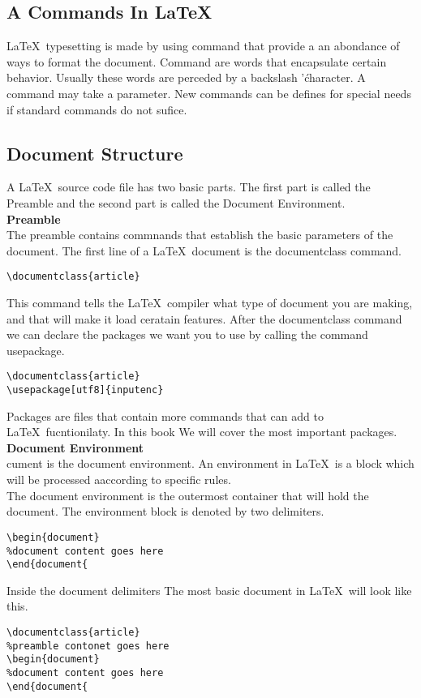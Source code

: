 \documentclass[12pt]{book}
\begin{document}
\subsection{A Commands In \LaTeX \ }
\LaTeX \ typesetting is made by using command that provide a an abondance of ways to format the document. 
Command are words that encapsulate certain behavior. Usually these words are perceded by a backslash '\' character. A command may take a parameter. 
New commands can be defines for special needs if standard commands do not sufice.

\subsection{Document Structure}
A \LaTeX \ source code file has two basic parts. The first part is called the Preamble and the second part is 
called the Document Environment.\\
\textbf{Preamble}\\
The preamble contains commnands that establish the basic parameters of the document.
The first line of a \LaTeX \ document is the documentclass command. 
\begin{lstlisting}[language={[latex]tex}]
\documentclass{article}
\end{lstlisting}
This command tells the \LaTeX \ compiler what type of document you are making, and that will make it load ceratain features.
After the documentclass command we can declare the packages we want you to use by calling the command usepackage.
\begin{lstlisting}[language={[latex]tex}]
\documentclass{article}
\usepackage[utf8]{inputenc}
\end{lstlisting}
Packages are files that contain more commands that can add to \LaTeX \ fucntionilaty. In this book We will cover the 
most important packages. 
\textbf{Document Environment}\\
cument is the document environment. An environment in \LaTeX \ is a block which will be processed aaccording to specific rules.\\ 
The document environment is the outermost container that will hold the
document. The environment block is denoted by two delimiters.
\begin{lstlisting}[language={[LaTeX]TeX}]
\begin{document}
%document content goes here
\end{document{
\end{lstlisting}
Inside the document delimiters 
The most basic document in \LaTeX \ will look like this.
\begin{lstlisting}[language={[LaTeX]TeX}]
\documentclass{article}
%preamble contonet goes here
\begin{document}
%document content goes here
\end{document{
\end{lstlisting}
\newpage
\end{document}
